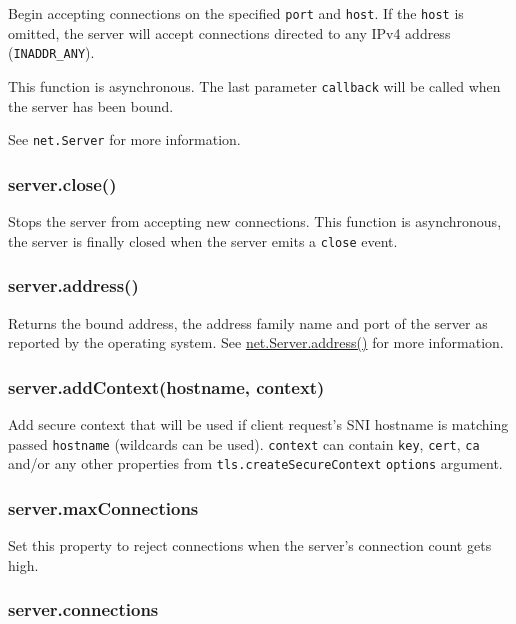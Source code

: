 Begin accepting connections on the specified \texttt{port} and
\texttt{host}. If the \texttt{host} is omitted, the server will accept
connections directed to any IPv4 address (\texttt{INADDR\_ANY}).

This function is asynchronous. The last parameter \texttt{callback} will
be called when the server has been bound.

See \texttt{net.Server} for more information.

\subsubsection{server.close()}\label{server.close}

Stops the server from accepting new connections. This function is
asynchronous, the server is finally closed when the server emits a
\texttt{\textquotesingle{}close\textquotesingle{}} event.

\subsubsection{server.address()}\label{server.address}

Returns the bound address, the address family name and port of the
server as reported by the operating system. See
\href{net.html\#net_server_address}{net.Server.address()} for more
information.

\subsubsection{server.addContext(hostname,
context)}\label{server.addcontexthostname-context}

Add secure context that will be used if client request's SNI hostname is
matching passed \texttt{hostname} (wildcards can be used).
\texttt{context} can contain \texttt{key}, \texttt{cert}, \texttt{ca}
and/or any other properties from \texttt{tls.createSecureContext}
\texttt{options} argument.

\subsubsection{server.maxConnections}\label{server.maxconnections}

Set this property to reject connections when the server's connection
count gets high.

\subsubsection{server.connections}\label{server.connections}

